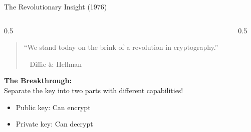\documentclass[aspectratio=169,10pt]{beamer}
\theoremstyle{plain}
\begin{document}
\begin{frame}{The Revolutionary Insight (1976)}
   \begin{columns}
       \begin{column}{0.5\textwidth}
           \begin{quote}
               ``We stand today on the brink of a revolution in cryptography.''
               
               \vspace{0.5em}
               -- Diffie \& Hellman
           \end{quote}
           
           \vspace{1em}
           \pause
           
           \textbf{The Breakthrough:}\\
           Separate the key into two parts with different capabilities!
           
           \vspace{0.5em}
           \pause
           \begin{itemize}
               \item \textcolor{qcgreen}{Public key: Can encrypt}
               \item \textcolor{qcred}{Private key: Can decrypt}
           \end{itemize}
       \end{column}
       
       \begin{column}{0.5\textwidth}
           \begin{center}
\end{center}
\end{column}
\end{columns}
\end{frame}
\end{document}
